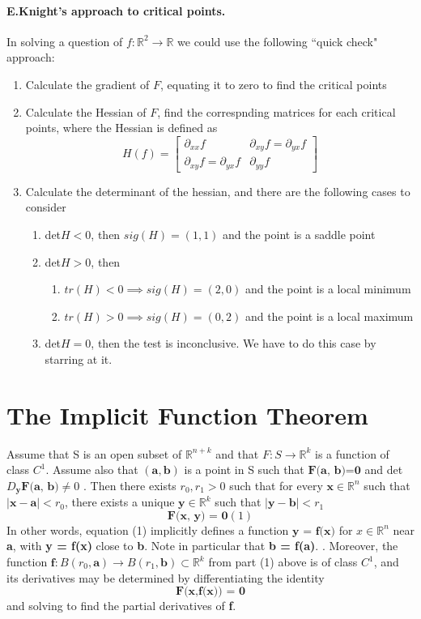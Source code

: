 \documentclass[11pt]{article}
\newcommand{\tb}[1]{\textbf{#1}}
\newcommand{\real}[0]{\mathbb{R}}
\begin{document}
\paragraph{E.Knight's approach to critical points.}In solving a question of $f:\real^2 \rightarrow{} \real$ we could use the following ``quick check" approach:
\begin{enumerate}
    \item Calculate the gradient of $F$, equating it to zero to find the critical points
    \item Calculate the Hessian of $F$, find the correspnding matrices for each critical points, where the Hessian is defined as
    \begin{equation*} H(f) = 
        \begin{bmatrix}
             \partial_{xx}f & \partial_{xy}f = \partial_{yx}f \\
             \partial_{xy}f = \partial_{yx}f & \partial_{yy}f
        \end{bmatrix}
    \end{equation*}
    \item Calculate the determinant of the hessian, and there are the following cases to consider
    \begin{enumerate}
        \item det$H<0$, then $sig(H) = (1,1)$ and the point is a saddle point
        \item det$H>0$, then
            \begin{enumerate}
                \item $tr(H)<0 \implies sig(H) = (2,0)$ and the point is a local minimum
                \item $tr(H)>0 \implies sig(H) = (0,2)$ and the point is a local maximum
            \end{enumerate}
        \item det$H=0$, then the test is inconclusive. We have to do this case by starring at it.
    \end{enumerate}
\end{enumerate}

\section{The Implicit Function Theorem}
Assume that S is an open subset of $\real^{n+k}$ and that $F: S \rightarrow \real^k$ is a function of class $C^1$. Assume also that $(\tb{a}, \tb{b})$ is a point in S such that $\tb{F(a, b)=0}$ and det$D_{\tb{y}}\tb{F(a, b)} \neq 0$ . Then there exists $r_0, r_1 > 0$ such that for every $\tb{x} \in \real^n$ such that $|\tb{x} - \tb{a}| < r_0$, there exists a unique $\tb{y} \in \real^k$ such that $|\tb{y} - \tb{b}| < r_1$
    $$\tb{F(x, y) = 0} (1)$$
    In other words, equation (1) implicitly defines a function $\tb{y = f(x)}$ for $x \in \real^n$ near \tb{a}, with \tb{y = f(x)} close to \tb{b}. Note in particular that \tb{b = f(a)}. . Moreover, the function $\tb{f}: B(r_0,\tb{a}) \rightarrow B(r_1, \tb{b}) \subset \real^k$ from part (1) above is of class $C^1$, and its derivatives may be determined by differentiating the identity $$\tb{F(x,f(x)) = 0}$$ and solving to find the partial derivatives of \tb{f}.
\end{document}
